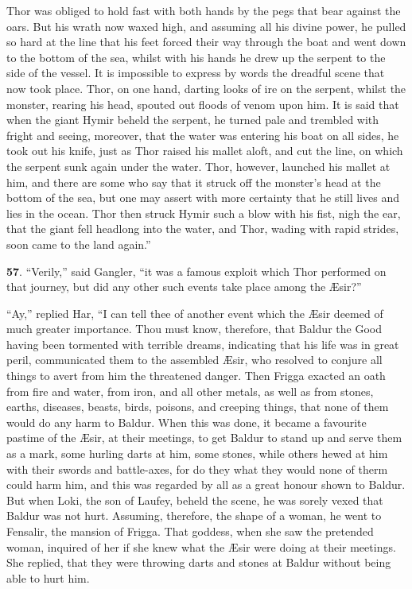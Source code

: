 Thor was obliged to hold fast with both hands by the pegs that bear
against the oars. But his wrath now waxed high, and assuming all his
divine power, he pulled so hard at the line that his feet forced their
way through the boat and went down to the bottom of the sea, whilst
with his hands he drew up the serpent to the side of the vessel. It is
impossible to express by words the dreadful scene that now took place.
Thor, on one hand, darting looks of ire on the serpent, whilst the
monster, rearing his head, spouted out floods of venom upon him. It is
said that when the giant Hymir beheld the serpent, he turned pale and
trembled with fright and seeing, moreover, that the water was
entering his boat on all sides, he took out his knife, just as Thor
raised his mallet aloft, and cut the line, on which the serpent sunk
again under the water. Thor, however, launched his mallet at him, and
there are some who say that it struck off the monster's head at the
bottom of the sea, but one may assert with more certainty that he
still lives and lies in the ocean. Thor then struck Hymir such a blow
with his fist, nigh the ear, that the giant fell headlong into the
water, and Thor, wading with rapid strides, soon came to the land
again.''


\textbf{57}. ``Verily,'' said Gangler, ``it was a famous exploit which Thor
performed on that journey, but did any other such events take place
among the Æsir?''

``Ay,'' replied Har, ``I can tell thee of another event which the Æsir
deemed of much greater importance. Thou must know, therefore, that
Baldur the Good having been tormented with terrible dreams, indicating
that his life was in great peril, communicated them to the assembled
Æsir, who resolved to conjure all things to avert from him the
threatened danger. Then Frigga exacted an oath from fire and water,
from iron, and all other metals, as well as from stones, earths,
diseases, beasts, birds, poisons, and creeping things, that none of
them would do any harm to Baldur. When this was done, it became a
favourite pastime of the Æsir, at their meetings, to get Baldur to
stand up and serve them as a mark, some hurling darts at him, some
stones, while others hewed at him with their swords and battle-axes,
for do they what they would none of therm could harm him, and this was
regarded by all as a great honour shown to Baldur. But when Loki, the
son of Laufey, beheld the scene, he was sorely vexed that Baldur was
not hurt. Assuming, therefore, the shape of a woman, he went to
Fensalir, the mansion of Frigga. That goddess, when she saw the
pretended woman, inquired of her if she knew what the Æsir were doing
at their meetings. She replied, that they were throwing darts and
stones at Baldur without being able to hurt him.

